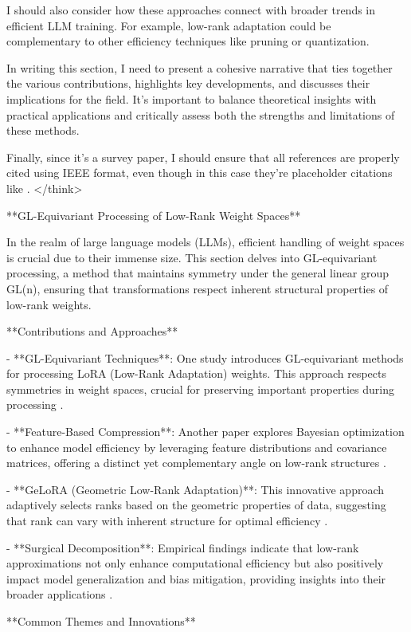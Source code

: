 \documentclass[conference]{IEEEtran}
\begin{document}
I should also consider how these approaches connect with broader trends in efficient LLM training. For example, low-rank adaptation could be complementary to other efficiency techniques like pruning or quantization.

In writing this section, I need to present a cohesive narrative that ties together the various contributions, highlights key developments, and discusses their implications for the field. It's important to balance theoretical insights with practical applications and critically assess both the strengths and limitations of these methods.

Finally, since it’s a survey paper, I should ensure that all references are properly cited using IEEE format, even though in this case they're placeholder citations like \cite{bX}.
</think>

**GL-Equivariant Processing of Low-Rank Weight Spaces**

In the realm of large language models (LLMs), efficient handling of weight spaces is crucial due to their immense size. This section delves into GL-equivariant processing, a method that maintains symmetry under the general linear group GL(n), ensuring that transformations respect inherent structural properties of low-rank weights.

**Contributions and Approaches**

- **GL-Equivariant Techniques**: One study introduces GL-equivariant methods for processing LoRA (Low-Rank Adaptation) weights. This approach respects symmetries in weight spaces, crucial for preserving important properties during processing \cite{bX}.
  
- **Feature-Based Compression**: Another paper explores Bayesian optimization to enhance model efficiency by leveraging feature distributions and covariance matrices, offering a distinct yet complementary angle on low-rank structures \cite{bY}.

- **GeLoRA (Geometric Low-Rank Adaptation)**: This innovative approach adaptively selects ranks based on the geometric properties of data, suggesting that rank can vary with inherent structure for optimal efficiency \cite{bZ}.

- **Surgical Decomposition**: Empirical findings indicate that low-rank approximations not only enhance computational efficiency but also positively impact model generalization and bias mitigation, providing insights into their broader applications \cite{bW}.

**Common Themes and Innovations**
\end{document}
